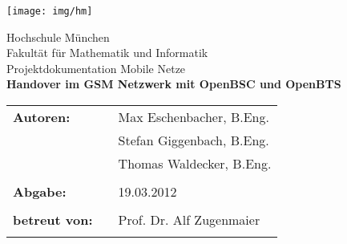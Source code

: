 %
\begin{titlepage}
\begin{flushright}
\texttt{[image: img/hm]}%
\end{flushright}

\vspace*{20mm}
\begin{center}
{\Large Hochschule München}\\
{\large Fakultät für Mathematik und Informatik}\\

\vspace*{15mm}
{\huge Projektdokumentation Mobile Netze}\\

\vspace*{10mm}
{\huge \bfseries{Handover im GSM Netzwerk mit OpenBSC und OpenBTS}} \\
\vspace*{15mm} 
\end{center}

\vspace*{30mm}

\begin{tabular}{lll}
\textbf{\large {Autoren:}} & & \large {Max Eschenbacher, B.Eng.}\\
			   & & \large {Stefan Giggenbach, B.Eng.}\\
			   & & \large {Thomas Waldecker, B.Eng.}\\
& & \\

\textbf{\large {Abgabe:}} & & \large {19.03.2012}\\
& & \\

\textbf{\large {betreut von:}} & & \large {Prof. Dr. Alf Zugenmaier}\\
& & \\
\end{tabular}

\end{titlepage}

\tableofcontents
\newpage
